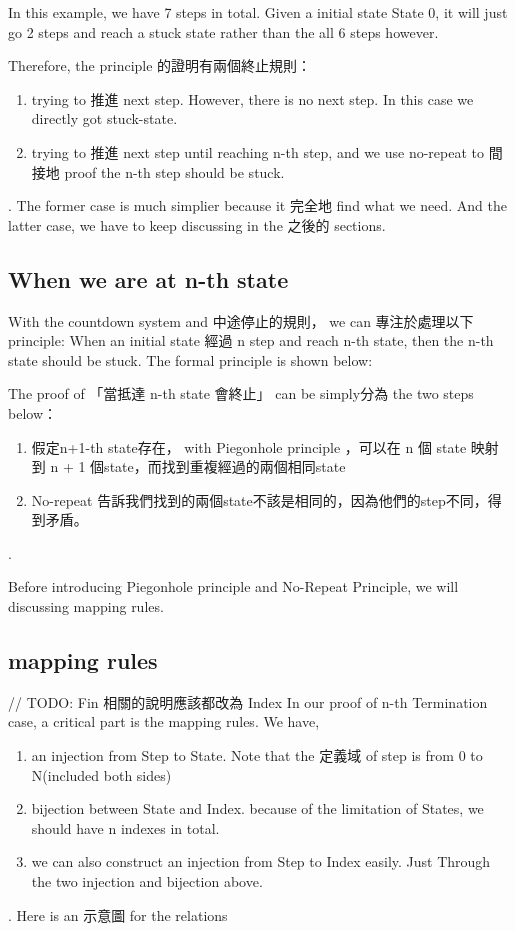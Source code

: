 

In this example, we have 7 steps in total.  Given a initial state State 0, it will just go 2 steps and reach a stuck state rather than the all 6 steps however.

Therefore, the principle 的證明有兩個終止規則：
\begin{enumerate}[1.]
    \item trying to 推進 next step.  However, there is no next step.  In this case we directly got stuck-state. 
    \item trying to 推進 next step until reaching n-th step, and we use no-repeat to 間接地 proof the n-th step should be stuck.
\end{enumerate}.
The former case is much simplier because it 完全地 find what we need. 
And the latter case, we have to keep discussing in the 之後的 sections.

\subsection{ When we are at n-th state }

With the countdown system and 中途停止的規則， we can 專注於處理以下 principle:
When an initial state 經過 n step and reach n-th state, then the n-th state should be stuck.
The formal principle is shown below:




The proof of 「當抵達 n-th state 會終止」 can be simply分為 the two steps below：
\begin{enumerate}[1.]
    \item 假定n+1-th state存在， with Piegonhole principle ，可以在 n 個 state 映射到 n + 1 個state，而找到重複經過的兩個相同state
    \item No-repeat 告訴我們找到的兩個state不該是相同的，因為他們的step不同，得到矛盾。
\end{enumerate}.

Before introducing Piegonhole principle and No-Repeat Principle, we will discussing mapping rules.

\subsection{ mapping rules }
// TODO: Fin 相關的說明應該都改為 Index
In our proof of n-th Termination case, a critical part is the mapping rules.
We have,
\begin{enumerate}[1.]
    \item an injection from Step to State.  Note that the 定義域 of step is from 0 to N(included both sides)
    \item bijection between State and Index. because of the limitation of States, we should have n indexes in total.
    \item we can also construct an injection from Step to Index easily.  Just Through the two injection and bijection above.
\end{enumerate}.
Here is an 示意圖 for the relations


